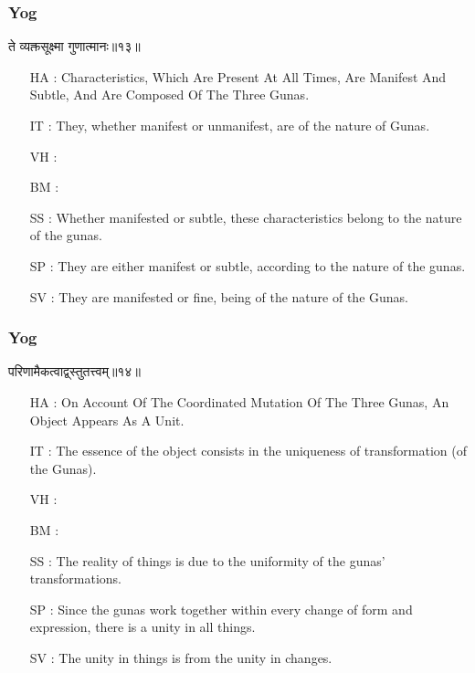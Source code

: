 \begin{frame}[fragile]\frametitle{Yog}
\begin{sanskrit}
ते व्यक्तसूक्ष्मा गुणात्मानः॥१३॥
\end{sanskrit}

	\begin{itemize}
	\item [HA]: Characteristics, Which Are Present At All Times, Are Manifest And Subtle, And Are Composed Of The Three Gunas.
	\item [IT]: They, whether manifest or unmanifest, are of the nature of Gunas.
	\item [VH]: 
	\item [BM]: 
	\item [SS]: Whether manifested or subtle, these characteristics belong to the nature of the gunas.
	\item [SP]: They are either manifest or subtle, according to the nature of the gunas.
	\item [SV]: They are manifested or fine, being of the nature of the Gunas. 
	\end{itemize}
\end{frame}



\begin{frame}[fragile]\frametitle{Yog}
\begin{sanskrit}
परिणामैकत्वाद्व्स्तुतत्त्वम्॥१४॥ 
\end{sanskrit}

	\begin{itemize}
	\item [HA]: On Account Of The Coordinated Mutation Of The Three Gunas, An Object Appears As A Unit.
	\item [IT]: The essence of the object consists in the uniqueness of transformation (of the Gunas).
	\item [VH]: 
	\item [BM]: 
	\item [SS]: The reality of things is due to the uniformity of the gunas’ transformations.
	\item [SP]: Since the gunas work together within every change of form and expression, there is a unity in all things.
	\item [SV]: The unity in things is from the unity in changes. 
	\end{itemize}
\end{frame}

